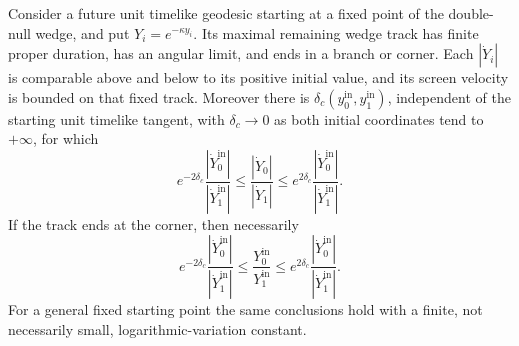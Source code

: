 \begin{lemma}\label{cmp:corner-ratios}
Consider a future unit timelike geodesic starting at a fixed point of
the double-null wedge, and put $Y_i=e^{-\kappa y_i}$. Its maximal
remaining wedge track has finite proper duration, has an angular limit,
and ends in a branch or corner. Each $|\dot Y_i|$ is comparable above
and below to its positive initial value, and its screen velocity is
bounded on that fixed track. Moreover there is
$\delta_c(y_0^{\mathrm{in}},y_1^{\mathrm{in}})$, independent of the
starting unit timelike tangent, with $\delta_c\to0$ as both initial
coordinates tend to $+\infty$, for which
\begin{equation}\label{cmp:ratio-control}
 e^{-2\delta_c}
       \frac{|\dot Y_0^{\mathrm{in}}|}{|\dot Y_1^{\mathrm{in}}|}
 \leq\frac{|\dot Y_0|}{|\dot Y_1|}
 \leq e^{2\delta_c}
       \frac{|\dot Y_0^{\mathrm{in}}|}{|\dot Y_1^{\mathrm{in}}|}.
\end{equation}
If the track ends at the corner, then necessarily
\begin{equation}\label{cmp:corner-necessary}
 e^{-2\delta_c}
       \frac{|\dot Y_0^{\mathrm{in}}|}{|\dot Y_1^{\mathrm{in}}|}
 \leq\frac{Y_0^{\mathrm{in}}}{Y_1^{\mathrm{in}}}
 \leq e^{2\delta_c}
       \frac{|\dot Y_0^{\mathrm{in}}|}{|\dot Y_1^{\mathrm{in}}|}.
\end{equation}
For a general fixed starting point the same conclusions hold with a
finite, not necessarily small, logarithmic-variation constant.
\end{lemma}

